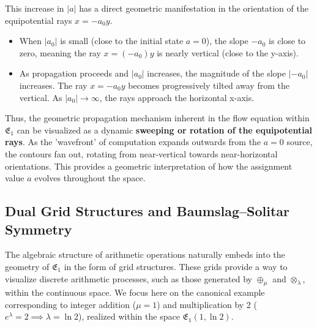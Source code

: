 \documentclass[12pt]{article}
\begin{document}
This increase in \( |a| \) has a direct geometric manifestation in the orientation of the equipotential rays \( x = -a_0 y \).
\begin{itemize}
    \item When \( |a_0| \) is small (close to the initial state \( a=0 \)), the slope \( -a_0 \) is close to zero, meaning the ray \( x = (-a_0) y \) is nearly vertical (close to the y-axis).
    \item As propagation proceeds and \( |a_0| \) increases, the magnitude of the slope \( |-a_0| \) increases. The ray \( x = -a_0 y \) becomes progressively tilted away from the vertical. As \( |a_0| \to \infty \), the rays approach the horizontal x-axis.
\end{itemize}
Thus, the geometric propagation mechanism inherent in the flow equation within \( \mathfrak{E}_1 \) can be visualized as a dynamic \textbf{sweeping or rotation of the equipotential rays}. As the 'wavefront' of computation expands outwards from the \( a=0 \) source, the contours fan out, rotating from near-vertical towards near-horizontal orientations. This provides a geometric interpretation of how the assignment value \( a \) evolves throughout the space.

\subsection{Dual Grid Structures and Baumslag–Solitar Symmetry} %

The algebraic structure of arithmetic operations naturally embeds into the geometry of \( \mathfrak{E}_1 \) in the form of grid structures. These grids provide a way to visualize discrete arithmetic processes, such as those generated by \( \oplus_\mu \) and \( \otimes_\lambda \), within the continuous space. We focus here on the canonical example corresponding to integer addition (\( \mu=1 \)) and multiplication by 2 (\( e^\lambda = 2 \implies \lambda = \ln 2 \)), realized within the space \( \mathfrak{E}_1(1, \ln 2) \).
\end{document}
